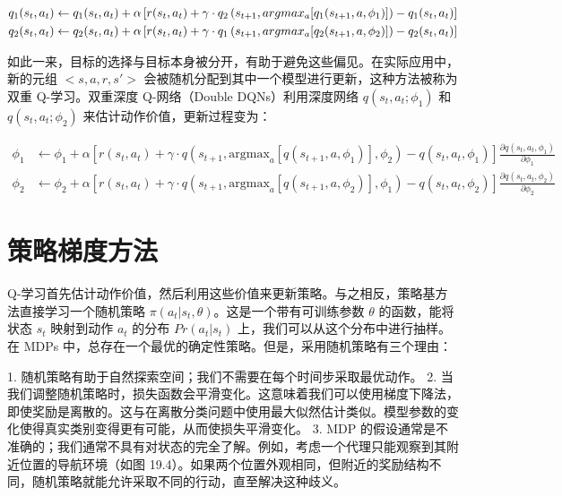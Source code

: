 \begin{align}
&q_1(s_t, a_t) \leftarrow q_1(s_t, a_t) + \alpha \left[ r(s_t, a_t) + \gamma \cdot q_2 \left( s_{t+1}, argmax_{a} [q_1(s_{t+1}, a, \phi_1)] \right) - q_1(s_t, a_t) \right] \notag\\
&q_2(s_t, a_t) \leftarrow q_2(s_t, a_t) + \alpha \left[ r(s_t, a_t) + \gamma \cdot q_1 \left( s_{t+1}, argmax_{a} [q_2(s_{t+1}, a, \phi_2)] \right) - q_2(s_t, a_t) \right] 
\end{align} 



如此一来，目标的选择与目标本身被分开，有助于避免这些偏见。在实际应用中，新的元组 \(<s, a, r, s'>\) 会被随机分配到其中一个模型进行更新，这种方法被称为双重 Q-学习。双重深度 Q-网络（Double DQNs）利用深度网络 \(q(s_t, a_t; \phi_1)\) 和 \(q(s_t, a_t; \phi_2)\) 来估计动作价值，更新过程变为：

\begin{equation}
\begin{aligned}
\phi_1 &\leftarrow \phi_1 + \alpha \left[ r(s_t, a_t) + \gamma \cdot q \left( s_{t+1}, \text{argmax}_a [q(s_{t+1}, a, \phi_1)], \phi_2 \right) - q(s_t, a_t, \phi_1) \right] \frac{\partial q(s_t, a_t, \phi_1)}{\partial \phi_1} \\
\phi_2 &\leftarrow \phi_2 + \alpha \left[ r(s_t, a_t) + \gamma \cdot q \left( s_{t+1}, \text{argmax}_a [q(s_{t+1}, a, \phi_2)], \phi_1 \right) - q(s_t, a_t, \phi_2) \right] \frac{\partial q(s_t, a_t, \phi_2)}{\partial \phi_2}
\end{aligned} 
\end{equation}


\section{策略梯度方法}
Q-学习首先估计动作价值，然后利用这些价值来更新策略。与之相反，策略基方法直接学习一个随机策略 \(\pi(a_t|s_t, \theta)\)。这是一个带有可训练参数 \(\theta\) 的函数，能将状态 \(s_t\) 映射到动作 \(a_t\) 的分布 \(Pr(a_t|s_t)\) 上，我们可以从这个分布中进行抽样。在 MDPs 中，总存在一个最优的确定性策略。但是，采用随机策略有三个理由：

1. 随机策略有助于自然探索空间；我们不需要在每个时间步采取最优动作。
2. 当我们调整随机策略时，损失函数会平滑变化。这意味着我们可以使用梯度下降法，即使奖励是离散的。这与在离散分类问题中使用最大似然估计类似。模型参数的变化使得真实类别变得更有可能，从而使损失平滑变化。
3. MDP 的假设通常是不准确的；我们通常不具有对状态的完全了解。例如，考虑一个代理只能观察到其附近位置的导航环境（如图 19.4）。如果两个位置外观相同，但附近的奖励结构不同，随机策略就能允许采取不同的行动，直至解决这种歧义。


